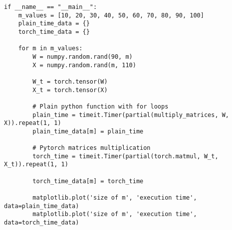 \documentclass{article}
\begin{document}
\begin{lstlisting}
if __name__ == "__main__":
    m_values = [10, 20, 30, 40, 50, 60, 70, 80, 90, 100]
    plain_time_data = {}
    torch_time_data = {}

    for m in m_values:
        W = numpy.random.rand(90, m)
        X = numpy.random.rand(m, 110)

        W_t = torch.tensor(W)
        X_t = torch.tensor(X)

        # Plain python function with for loops
        plain_time = timeit.Timer(partial(multiply_matrices, W, X)).repeat(1, 1)
        plain_time_data[m] = plain_time

        # Pytorch matrices multiplication
        torch_time = timeit.Timer(partial(torch.matmul, W_t, X_t)).repeat(1, 1)

        torch_time_data[m] = torch_time

        matplotlib.plot('size of m', 'execution time', data=plain_time_data)
        matplotlib.plot('size of m', 'execution time', data=torch_time_data)

\end{lstlisting}
\end{document}
